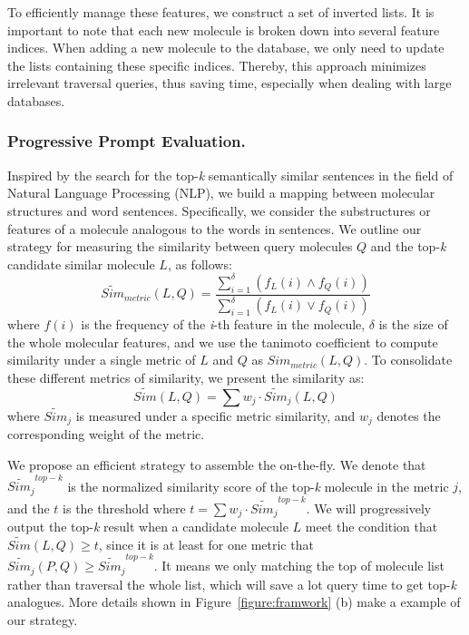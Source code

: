 \documentclass[letterpaper]{article} %
\begin{document}
To efficiently manage these features, we construct a set of inverted lists. It is important to note that each new molecule is broken down into several feature indices. When adding a new molecule to the database, we only need to update the lists containing these specific indices. Thereby, this approach minimizes irrelevant traversal queries, thus saving time, especially when dealing with large databases.


\subsubsection{Progressive Prompt Evaluation.}
Inspired by the search for the top-\textit{k} semantically similar sentences in the field of Natural Language Processing (NLP), we build a mapping between molecular structures and word sentences. 
Specifically, we consider the substructures or features of a molecule analogous to the words in sentences.
We outline our strategy for measuring the similarity between query molecules $Q$ and the top-\textit{k} candidate similar molecule $L$, as follows:
\begin{equation}
    \widetilde{Sim}_{metric}(L, Q) = \frac{\sum\limits_{i=1}^\delta(f_{L}(i) \wedge f_{Q}(i))}{\sum\limits_{i=1}^\delta(f_{L}(i)\vee f_{Q}(i))}
\end{equation}
where $f(i)$ is the frequency of the \textit{i}-th feature in the molecule, $\delta$ is the size of the whole molecular features, and we use the tanimoto coefficient to compute similarity under a single metric of $L$ and $Q$ as $Sim_{metric}(L, Q)$. To consolidate these different metrics of similarity, we present the similarity as:
\begin{equation}
    \widetilde{Sim}(L, Q) = \sum w_{j} \cdot \widetilde{Sim}_{j}(L, Q)
\end{equation}
where $\widetilde{Sim}_{j}$ is measured under a specific metric similarity, and $w_j$ denotes the corresponding weight of the metric.

We propose an efficient strategy to assemble the on-the-fly. We denote that $\widetilde{Sim_j}^{top-k}$ is the normalized similarity score of the top-\textit{k} molecule in the metric $j$, and the $t$ is the threshold where $t = \sum w_j \cdot \widetilde{Sim_j}^{top-k}$. We will progressively output the top-\textit{k} result when a candidate molecule $L$ meet the condition that $\widetilde{Sim}(L, Q) \geq t$, since it is at least for one metric that $\widetilde{Sim_j}(P, Q) \geq \widetilde{Sim_j}^{top-k}$. It means we only matching the top of molecule list rather than traversal the whole list, which will save a lot query time to get top-\textit{k} analogues.
More details shown in Figure~\ref{figure:framwork} (b) make a example of our strategy.
\end{document}
